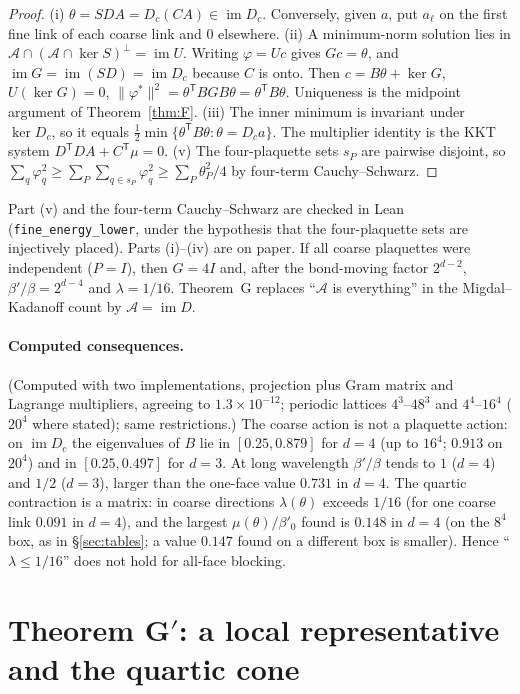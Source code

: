 \documentclass[11pt,a4paper]{article}
\theoremstyle{definition}
\theoremstyle{remark}
\newcommand{\cA}{\mathcal{A}}
\newcommand{\code}[1]{\texttt{#1}}
\newcommand{\im}{\operatorname{im}}
\begin{document}
\begin{proof}
(i) $\theta=SDA=D_c(CA)\in\im D_c$. Conversely, given $a$, put $a_\ell$ on the first fine link of each coarse link and $0$ elsewhere. (ii) A minimum-norm solution lies in $\cA\cap(\cA\cap\ker S)^\perp=\im U$. Writing $\varphi=Uc$ gives $Gc=\theta$, and $\im G=\im(SD)=\im D_c$ because $C$ is onto. Then $c=B\theta+\ker G$, $U(\ker G)=0$, $\|\varphi^*\|^2=\theta^{\mathsf T}BGB\theta=\theta^{\mathsf T}B\theta$. Uniqueness is the midpoint argument of Theorem~\ref{thm:F}. (iii) The inner minimum is invariant under $\ker D_c$, so it equals $\frac12\min\{\theta^{\mathsf T}B\theta:\theta=D_ca\}$. The multiplier identity is the KKT system $D^{\mathsf T}DA+C^{\mathsf T}\mu=0$. (v) The four-plaquette sets $s_P$ are pairwise disjoint, so $\sum_q\varphi_q^2\ge\sum_P\sum_{q\in s_P}\varphi_q^2\ge\sum_P\theta_P^2/4$ by four-term Cauchy--Schwarz.
\end{proof}

Part (v) and the four-term Cauchy--Schwarz are checked in Lean (\code{fine\_energy\_lower}, under the hypothesis that the four-plaquette sets are injectively placed).
Parts (i)--(iv) are on paper.
If all coarse plaquettes were independent ($P=I$), then $G=4I$ and, after the bond-moving factor $2^{d-2}$, $\beta'/\beta=2^{d-4}$ and $\lambda=1/16$.
Theorem~G replaces ``$\cA$ is everything'' in the Migdal--Kadanoff count by $\cA=\im D$.

\paragraph{Computed consequences.}
(Computed with two implementations, projection plus Gram matrix and Lagrange multipliers, agreeing to $1.3\times10^{-12}$; periodic lattices $4^3$--$48^3$ and $4^4$--$16^4$ ($20^4$ where stated); same restrictions.)
The coarse action is not a plaquette action: on $\im D_c$ the eigenvalues of $B$ lie in $[0.25,0.879]$ for $d=4$ (up to $16^4$; $0.913$ on $20^4$) and in $[0.25,0.497]$ for $d=3$.
At long wavelength $\beta'/\beta$ tends to $1$ ($d=4$) and $1/2$ ($d=3$), larger than the one-face value $0.731$ in $d=4$.
The quartic contraction is a matrix: in coarse directions $\lambda(\theta)$ exceeds $1/16$ (for one coarse link $0.091$ in $d=4$), and the largest $\mu(\theta)/\beta'_0$ found is $0.148$ in $d=4$ (on the $8^4$ box, as in \S\ref{sec:tables}; a value $0.147$ found on a different box is smaller). Hence ``$\lambda\le1/16$'' does not hold for all-face blocking.

\section{Theorem G$'$: a local representative and the quartic cone}\label{sec:Gprime}
\end{document}
